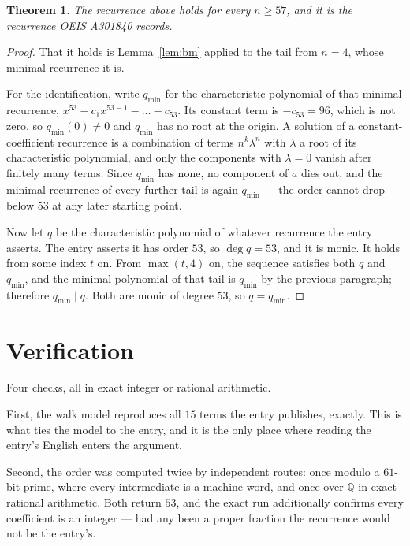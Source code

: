 \documentclass[11pt,a4paper]{article}
\theoremstyle{plain}
\newtheorem{theorem}{Theorem}
\theoremstyle{definition}
\begin{document}
\begin{theorem}
The recurrence above holds for every $n\ge57$, and it is the recurrence OEIS A301840 records.
\end{theorem}

\begin{proof}
That it holds is Lemma~\ref{lem:bm} applied to the tail from $n=4$, whose minimal
recurrence it is.

For the identification, write $q_{\min}$ for the characteristic polynomial of that minimal
recurrence, $x^{53}-c_1x^{53-1}-\dots-c_{53}$. Its constant term is
$-c_{53}=96$, which is not zero, so $q_{\min}(0)\neq0$ and $q_{\min}$ has no
root at the origin. A solution of a constant-coefficient recurrence is a combination of terms
$n^{k}\lambda^{n}$ with $\lambda$ a root of its characteristic polynomial, and only the
components with $\lambda=0$ vanish after finitely many terms. Since $q_{\min}$ has none, no
component of $a$ dies out, and the minimal recurrence of every further tail is again
$q_{\min}$ --- the order cannot drop below $53$ at any later starting point.

Now let $q$ be the characteristic polynomial of whatever recurrence the entry asserts. The
entry asserts it has order $53$, so $\deg q=53$, and it is monic. It holds from some
index $t$ on. From $\max(t,4)$ on, the sequence satisfies both $q$ and $q_{\min}$, and
the minimal polynomial of that tail is $q_{\min}$ by the previous paragraph; therefore
$q_{\min}\mid q$. Both are monic of degree $53$, so $q=q_{\min}$.
\end{proof}

\section{Verification}

Four checks, all in exact integer or rational arithmetic.

First, the walk model reproduces all $15$ terms the entry publishes, exactly. This is
what ties the model to the entry, and it is the only place where reading the entry's English
enters the argument.

Second, the order was computed twice by independent routes: once modulo a $61$-bit prime, where
every intermediate is a machine word, and once over $\mathbb{Q}$ in exact rational arithmetic.
Both return $53$, and the exact run additionally confirms every coefficient is an integer
--- had any been a proper fraction the recurrence would not be the entry's.
\end{document}
